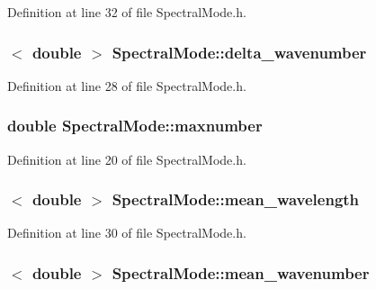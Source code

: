 Definition at line 32 of file SpectralMode.h.

\hypertarget{classSpectralMode_a79cec2adab5afc8d84f09bd3f4a222d3}{
\subsubsection[{delta\_\-wavenumber}]{$<$ double $>$ {\bf SpectralMode::delta\_\-wavenumber}}}
\label{classSpectralMode_a79cec2adab5afc8d84f09bd3f4a222d3}


Definition at line 28 of file SpectralMode.h.

\hypertarget{classSpectralMode_aa0e01cba630aff89cf934470513e7f89}{
\subsubsection[{maxnumber}]{\setlength{\rightskip}{0pt plus 5cm}double {\bf SpectralMode::maxnumber}}}
\label{classSpectralMode_aa0e01cba630aff89cf934470513e7f89}


Definition at line 20 of file SpectralMode.h.

\hypertarget{classSpectralMode_af83f2181ef2b8660feac40e7691893d6}{
\subsubsection[{mean\_\-wavelength}]{$<$ double $>$ {\bf SpectralMode::mean\_\-wavelength}}}
\label{classSpectralMode_af83f2181ef2b8660feac40e7691893d6}


Definition at line 30 of file SpectralMode.h.

\hypertarget{classSpectralMode_ad32246c8a4ebe1bfdc7879849fa6fd6f}{
\subsubsection[{mean\_\-wavenumber}]{$<$ double $>$ {\bf SpectralMode::mean\_\-wavenumber}}}
\label{classSpectralMode_ad32246c8a4ebe1bfdc7879849fa6fd6f}



